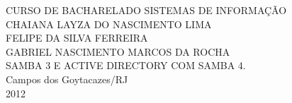 \begin{titlepage}
 \begin{figure}[ht]
 \centering
 \end{figure}
 \begin{center}
   {\large CURSO DE BACHARELADO SISTEMAS DE INFORMAÇÃO} \\ [3.5cm]
  	{\large CHAIANA LAYZA DO NASCIMENTO LIMA} \\
	{\large FELIPE DA SILVA FERREIRA} \\	
	{\large GABRIEL NASCIMENTO MARCOS DA ROCHA} \\ [4cm]
   {\large SAMBA 3 E ACTIVE DIRECTORY COM SAMBA 4.}\\ [2cm]
   \vfill
   {\large Campos dos Goytacazes/RJ} \\
   {\large 2012}
 \end{center}
\end{titlepage}
